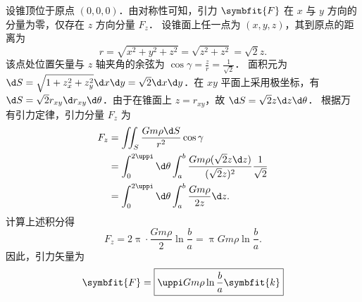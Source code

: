 \begin{solution}
    设锥顶位于原点 $(0,0,0)$．由对称性可知，引力 $\symbfit{F}$ 在 $x$ 与 $y$ 方向的分量为零，仅存在 $z$ 方向分量 $F_z$．
    设锥面上任一点为 $(x, y, z)$，其到原点的距离为
    \begin{equation}
        r = \sqrt{x^2 + y^2 + z^2} = \sqrt{z^2 + z^2} = \sqrt{2} z.
    \end{equation}
    该点处位置矢量与 $z$ 轴夹角的余弦为 $\cos \gamma = \frac{z}{r} = \frac{1}{\sqrt{2}}$．
    面积元为 $\d S = \sqrt{1 + z_x^2 + z_y^2} \d x \d y = \sqrt{2} \d x \d y$．在 $xy$ 平面上采用极坐标，有 $\d S = \sqrt{2} r_{xy} \d r_{xy} \d \theta$．由于在锥面上 $z = r_{xy}$，故 $\d S = \sqrt{2} z \d z \d \theta$．
    根据万有引力定律，引力分量 $F_z$ 为
    \begin{equation}
        \begin{aligned}
            F_z & = \iint_{S} \frac{G m \rho \d S}{r^2} \cos \gamma                                                               \\
                & = \int_{0}^{2\uppi} \d \theta \int_{a}^{b} \frac{G m \rho (\sqrt{2} z \d z)}{(\sqrt{2} z)^2} \frac{1}{\sqrt{2}} \\
                & = \int_{0}^{2\uppi} \d \theta \int_{a}^{b} \frac{G m \rho}{2 z} \d z.
        \end{aligned}
    \end{equation}
    计算上述积分得
    \begin{equation}
        F_z = 2\uppi \cdot \frac{G m \rho}{2} \ln \frac{b}{a} = \uppi G m \rho \ln \frac{b}{a}.
    \end{equation}
    因此，引力矢量为
    \begin{equation}
        \symbfit{F} = \boxed{\uppi G m \rho \ln \frac{b}{a} \symbfit{k}}
    \end{equation}
\end{solution}




\endinput
